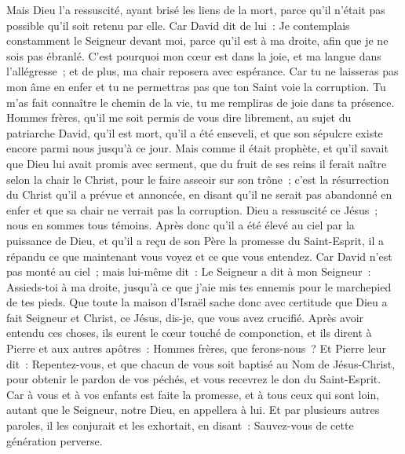 \begin{multicols}{2}
Mais Dieu l'a ressuscité, ayant brisé les liens de la mort, parce qu'il n'était pas possible qu'il soit retenu par elle.
Car David dit de lui~: Je contemplais constamment le Seigneur devant moi, parce qu'il est à ma droite, afin que je ne sois pas ébranlé.
C'est pourquoi mon cœur est dans la joie, et ma langue dans l'allégresse~; et de plus, ma chair reposera avec espérance.
Car tu ne laisseras pas mon âme en enfer et tu ne permettras pas que ton Saint voie la corruption.
Tu m'as fait connaître le chemin de la vie, tu me rempliras de joie dans ta présence.
Hommes frères, qu'il me soit permis de vous dire librement, au sujet du patriarche David, qu'il est mort, qu'il a été enseveli, et que son sépulcre existe encore parmi nous jusqu'à ce jour.
Mais comme il était prophète, et qu'il savait que Dieu lui avait promis avec serment, que du fruit de ses reins il ferait naître selon la chair le Christ, pour le faire asseoir sur son trône~;
c'est la résurrection du Christ qu'il a prévue et annoncée, en disant qu'il ne serait pas abandonné en enfer et que sa chair ne verrait pas la corruption.
Dieu a ressuscité ce Jésus~; nous en sommes tous témoins.
Après donc qu'il a été élevé au ciel par la puissance de Dieu, et qu'il a reçu de son Père la promesse du Saint-Esprit, il a répandu ce que maintenant vous voyez et ce que vous entendez.
Car David n'est pas monté au ciel~; mais lui-même dit~: Le Seigneur a dit à mon Seigneur~: Assieds-toi à ma droite,
jusqu'à ce que j'aie mis tes ennemis pour le marchepied de tes pieds. 
Que toute la maison d'Israël sache donc avec certitude que Dieu a fait Seigneur et Christ, ce Jésus, dis-je, que vous avez crucifié.
Après avoir entendu ces choses, ils eurent le cœur touché de componction, et ils dirent à Pierre et aux autres apôtres~: Hommes frères, que ferons-nous~?
Et Pierre leur dit~: Repentez-vous, et que chacun de vous soit baptisé au Nom de Jésus-Christ, pour obtenir le pardon de vos péchés, et vous recevrez le don du Saint-Esprit.
Car à vous et à vos enfants est faite la promesse, et à tous ceux qui sont loin, autant que le Seigneur, notre Dieu, en appellera à lui.
Et par plusieurs autres paroles, il les conjurait et les exhortait, en disant~: Sauvez-vous de cette génération perverse.

\end{multicols}

